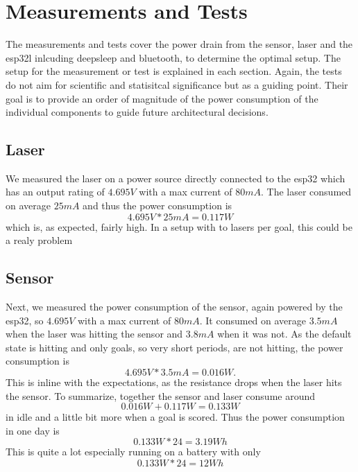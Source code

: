 \section{Measurements and Tests}
The measurements and tests cover the power drain from the sensor, laser and the esp32l inlcuding deepsleep and bluetooth, to determine the optimal setup. The setup for the measurement or test is explained in each section. Again, the tests do not aim for scientific and statisitcal significance but as a guiding point. Their goal is to provide an order of magnitude of the power consumption of the individual components to guide future architectural decisions. 


\subsection{Laser}
We measured the laser on a power source directly connected to the esp32 which has an output rating of $4.695V$ with a max current of $80mA$. The laser consumed on average $25mA$ and thus the power consumption is
\begin{equation*}
    4.695V * 25mA = 0.117W
\end{equation*}
which is, as expected, fairly high. In a setup with to lasers per goal, this could be a realy problem


\subsection{Sensor}
Next, we measured the power consumption of the sensor, again powered by the esp32, so $4.695V$ with a max current of $80mA$. It consumed on average $3.5mA$ when the laser was hitting the sensor and $3.8mA$ when it was not. As the default state is hitting and only goals, so very short periods, are not hitting, the power consumption is
  \begin{equation*}
      4.695V * 3.5mA = 0.016W.
    \end{equation*}
This is inline with the expectations, as the resistance drops when the laser hits the sensor. 
To summarize, together the sensor and laser consume around  
\begin{equation*}
    0.016W + 0.117W = 0.133W
  \end{equation*}
in idle and a little bit more when a goal is scored. Thus the power consumption in one day is
\begin{equation*}
    0.133W * 24 = 3.19Wh
\end{equation*}
This is quite a lot especially running on a battery with only
\begin{equation*}
    0.133W * 24 = 12Wh
\end{equation*}

